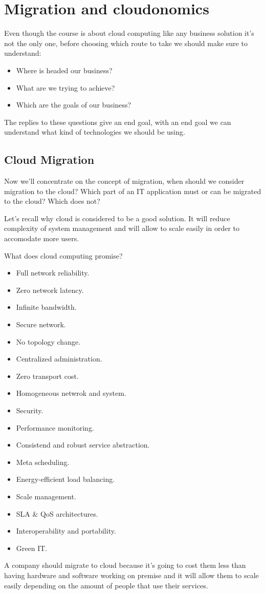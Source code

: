 \chapter{Migration and cloudonomics}
Even though the course is about cloud computing like any business solution it's not the only one, before choosing which route to take we should make sure to understand:
\begin{itemize}
    \item Where is headed our business?
    \item What are we trying to achieve?
    \item Which are the goals of our business?
\end{itemize}
The replies to these questions give an end goal, with an end goal we can understand what kind of technologies we should be using.
\section{Cloud Migration}
Now we'll concentrate on the concept of migration, when should we consider migration to the cloud? Which part of an IT application must or can be migrated to the cloud? Which does not?

Let's recall why cloud is considered to be a good solution. It will reduce complexity of system management and will allow to scale easily in order to accomodate more users.

What does cloud computing promise?
\begin{itemize}
    \item Full network reliability.
    \item Zero network latency.
    \item Infinite bandwidth.
    \item Secure network.
    \item No topology change.
    \item Centralized administration.
    \item Zero transport cost.
    \item Homogeneous netwrok and system.
    \item Security.
    \item Performance monitoring.
    \item Consistend and robust service abstraction.
    \item Meta scheduling.
    \item Energy-efficient load balancing.
    \item Scale management.
    \item SLA \& QoS architectures.
    \item Interoperability and portability.
    \item Green IT.
\end{itemize}
A company should migrate to cloud because it's going to cost them less than having hardware and software working on premise and it will allow them to scale easily depending on the amount of people that use their services.

